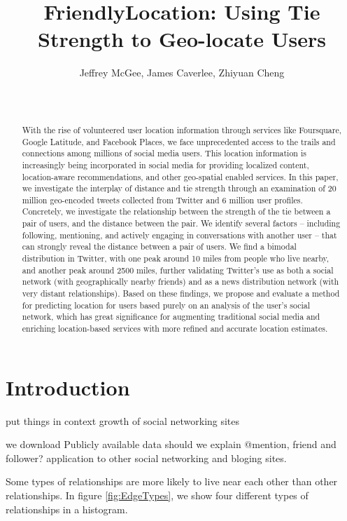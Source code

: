 \documentclass{sig-alternate}
\title{FriendlyLocation: Using Tie Strength to Geo-locate Users
}
\author{
    \alignauthor Jeffrey McGee, James Caverlee, Zhiyuan Cheng\\
    \affaddr{Department of Computer Science and Engineering, Texas A\&M
    University} \\
    \affaddr{ College Station, TX 77845 USA} \\
    \email{jeffamcgee@tamu.edu, caverlee@cse.tamu.edu, chengzy@cse.tamu.edu}
}
\begin{document}
\maketitle
\begin{abstract}
With the rise of volunteered user location information through services like
Foursquare, Google Latitude, and Facebook Places, we face unprecedented access
to the trails and connections among millions of social media users. This
location information is increasingly being incorporated in social media for
providing localized content, location-aware recommendations, and other
geo-spatial enabled services. In this paper, we investigate the interplay of
distance and tie strength through an examination of 20 million geo-encoded
tweets collected from Twitter and 6 million user profiles. Concretely, we
investigate the relationship between the strength of the tie between a pair of
users, and the distance between the pair. We identify several factors --
including following, mentioning, and actively engaging in conversations with
another user -- that can strongly reveal the distance between a pair of users.
We find a bimodal distribution in Twitter, with one peak around 10 miles from
people who live nearby, and another peak around 2500 miles, further validating
Twitter's use as both a social network (with geographically nearby friends) and
as a news distribution network (with very distant relationships). Based on
these findings, we propose and evaluate a method for predicting location for
users based purely on an analysis of the user's social network, which has great
significance for augmenting traditional social media and enriching
location-based services with more refined and accurate location estimates.

\end{abstract}




\section{Introduction}

put things in context
growth of social networking sites

we download Publicly available data
should we explain @mention, friend and follower?
application to other social networking and bloging sites.

Some types of relationships are more likely to live near each other than other relationships.
In figure \ref{fig:EdgeTypes}, we show four different types of relationships in a histogram.
\end{document}
